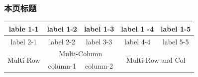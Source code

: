 \documentclass[presentation]{beamer}
\begin{document}
\begin{frame}
  \frametitle{}%

\end{frame}














\begin{frame}
  \frametitle{本页标题}

\begin{tabular}{|c|c|c|c|c|}%
\hline \hline 
lable 1-1 & label 1-2 & label 1-3 & label 1 -4 & label 1-5\\\hline
label 2-1 & label 2-2 & label 3-3 & label 4-4 & label 5-5 \\\hline
\multirow{2}{*}{Multi-Row} & \multicolumn{2}{|c|}{Multi-Column} & \multicolumn{2}{|c|}{\multirow{2}{*}{Multi-Row and Col}} \\\cline{2-3} 
& column-1 & column-2 & \multicolumn{2}{|c|}{}\\%
\hline
\end{tabular}

\end{frame}
\end{document}
